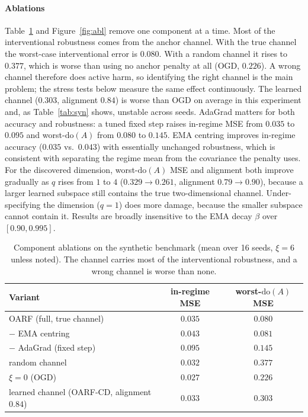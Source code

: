 \documentclass[authoryear,preprint,12pt]{elsarticle}
\theoremstyle{plain}
\theoremstyle{remark}
\newcommand{\doop}{\mathrm{do}}
\newcommand{\OARF}{\textsc{OARF}}
\newcommand{\OARFCD}{\textsc{OARF-CD}}
\begin{document}
\paragraph{Ablations}
Table~\ref{tab:abl} and Figure~\ref{fig:abl} remove one component at a time. Most of the
interventional robustness comes from the anchor channel. With the true channel the
worst-case interventional error is $0.080$. With a random channel it rises to $0.377$,
which is worse than using no anchor penalty at all (OGD, $0.226$). A wrong channel
therefore does active harm, so identifying the right channel is the main problem; the
stress tests below measure the same effect continuously. The learned channel ($0.303$, alignment $0.84$) is worse than OGD on average in this experiment and, as Table~\ref{tab:syn}
shows, unstable across seeds. AdaGrad matters for both accuracy and robustness: a tuned
fixed step raises in-regime MSE from $0.035$ to $0.095$ and worst-$\doop(A)$ from $0.080$
to $0.145$. EMA centring improves in-regime accuracy ($0.035$ vs.\ $0.043$) with
essentially unchanged robustness, which is consistent with separating the regime mean from
the covariance the penalty uses. For the discovered dimension, worst-$\doop(A)$ MSE and
alignment both improve gradually as $q$ rises from $1$ to $4$ ($0.329\!\to\!0.261$,
alignment $0.79\!\to\!0.90$), because a larger learned subspace still contains the true
two-dimensional channel. Under-specifying the dimension ($q=1$) does more damage, because
the smaller subspace cannot contain it. Results are broadly insensitive to the EMA decay
$\beta$ over $[0.90,0.995]$.

\begin{table}[htbp]
\centering
\caption{Component ablations on the synthetic benchmark (mean over 16 seeds, $\xi=6$
unless noted). The channel carries most of the interventional robustness, and a wrong
channel is worse than none.}
\label{tab:abl}
\small
\begin{tabular}{lcc}
\toprule
Variant & in-regime MSE & worst-$\doop(A)$ MSE\\
\midrule
\OARF{} (full, true channel) & $0.035$ & $\mathbf{0.080}$\\
\quad $-$ EMA centring        & $0.043$ & $0.081$\\
\quad $-$ AdaGrad (fixed step) & $0.095$ & $0.145$\\
\quad random channel          & $0.032$ & $0.377$\\
\quad $\xi=0$ (OGD)           & $0.027$ & $0.226$\\
\midrule
learned channel (\OARFCD{}, alignment $0.84$) & $0.033$ & $0.303$\\
\bottomrule
\end{tabular}
\end{table}
\end{document}
